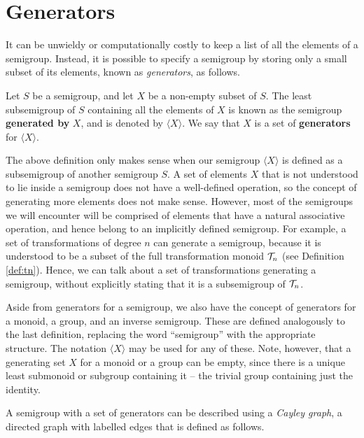 \section{Generators}
\label{sec:intro-generators}

It can be unwieldy or computationally costly to keep a list of all the elements
of a semigroup.  Instead, it is possible to specify a semigroup by storing only
a small subset of its elements, known as \textit{generators}, as follows.

\begin{definition}
  \label{def:generator}
  Let $S$ be a semigroup, and let $X$ be a non-empty subset of $S$.  The least
  subsemigroup of $S$ containing all the elements of $X$ is known as the
  semigroup \textbf{generated by} $X$, and is denoted by $\langle X \rangle$.
  We say that $X$ is a set of \textbf{generators} for $\langle X \rangle$.
\end{definition}

The above definition only makes sense when our semigroup $\langle X \rangle$ is
defined as a subsemigroup of another semigroup $S$.  A set of elements $X$ that
is not understood to lie inside a semigroup does not have a well-defined
operation, so the concept of generating more elements does not make sense.
However, most of the semigroups we will encounter will be comprised of elements
that have a natural associative operation, and hence belong to an implicitly
defined semigroup.  For example, a set of transformations of degree $n$ can
generate a semigroup, because it is understood to be a subset of the full
transformation monoid $\mathcal{T}_n$ (see Definition \ref{def:tn}).  Hence, we can
talk about a set of transformations generating a semigroup, without explicitly
stating that it is a subsemigroup of $\mathcal{T}_n$.

Aside from generators for a semigroup, we also have the concept of generators
for a monoid, a group, and an inverse semigroup.  These are defined analogously
to the last definition, replacing the word ``semigroup'' with the appropriate
structure.  The notation $\langle X \rangle$ may be used for any of these.
Note, however, that a generating set $X$ for a monoid or a group can be empty,
since there is a unique least submonoid or subgroup containing it -- the
trivial group containing just the identity.

A semigroup with a set of generators can be described using a \textit{Cayley
  graph}, a directed graph with labelled edges that is defined as follows.

